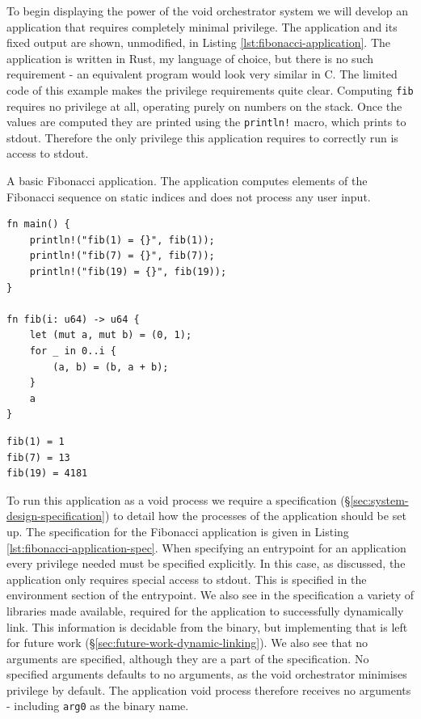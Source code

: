 \documentclass[12pt,a4paper,twoside]{report}
\begin{document}
To begin displaying the power of the void orchestrator system we will develop an application that requires completely minimal privilege. The application and its fixed output are shown, unmodified, in Listing \ref{lst:fibonacci-application}. The application is written in Rust, my language of choice, but there is no such requirement - an equivalent program would look very similar in C. The limited code of this example makes the privilege requirements quite clear. Computing \texttt{fib} requires no privilege at all, operating purely on numbers on the stack. Once the values are computed they are printed using the \texttt{println!} macro, which prints to stdout. Therefore the only privilege this application requires to correctly run is access to stdout.

\begin{listing}
\label{lst:fibonacci-application}
\caption{A basic Fibonacci application. The application computes elements of the Fibonacci sequence on static indices and does not process any user input.}

\begin{verbatim}
fn main() {
    println!("fib(1) = {}", fib(1));
    println!("fib(7) = {}", fib(7));
    println!("fib(19) = {}", fib(19));
}

fn fib(i: u64) -> u64 {
    let (mut a, mut b) = (0, 1);
    for _ in 0..i {
        (a, b) = (b, a + b);
    }
    a
}
\end{verbatim}
\begin{verbatim}
fib(1) = 1
fib(7) = 13
fib(19) = 4181
\end{verbatim}
\end{listing}

To run this application as a void process we require a specification (§\ref{sec:system-design-specification}) to detail how the processes of the application should be set up. The specification for the Fibonacci application is given in Listing \ref{lst:fibonacci-application-spec}. When specifying an entrypoint for an application every privilege needed must be specified explicitly. In this case, as discussed, the application only requires special access to stdout. This is specified in the environment section of the entrypoint. We also see in the specification a variety of libraries made available, required for the application to successfully dynamically link. This information is decidable from the binary, but implementing that is left for future work (§\ref{sec:future-work-dynamic-linking}). We also see that no arguments are specified, although they are a part of the specification. No specified arguments defaults to no arguments, as the void orchestrator minimises privilege by default. The application void process therefore receives no arguments - including \texttt{arg0} as the binary name.
\end{document}
